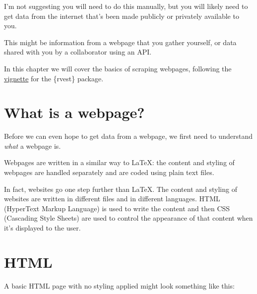 \documentclass[
  letterpaper,
  DIV=11,
  numbers=noendperiod]{scrreprt}
\begin{document}
I'm not suggesting you will need to do this manually, but you will
likely need to get data from the internet that's been made publicly or
privately available to you.

This might be information from a webpage that you gather yourself, or
data shared with you by a collaborator using an API.

In this chapter we will cover the basics of scraping webpages, following
the
\href{https://cran.r-project.org/web/packages/rvest/vignettes/rvest.html\#fnref3}{vignette}
for the \{rvest\} package.

\section{What is a webpage?}\label{what-is-a-webpage}

Before we can even hope to get data from a webpage, we first need to
understand \emph{what} a webpage is.

Webpages are written in a similar way to LaTeX: the content and styling
of webpages are handled separately and are coded using plain text files.

In fact, websites go one step further than LaTeX. The content and
styling of websites are written in different files and in different
languages. HTML (HyperText Markup Language) is used to write the content
and then CSS (Cascading Style Sheets) are used to control the appearance
of that content when it's displayed to the user.

\section{HTML}\label{html}

A basic HTML page with no styling applied might look something like
this:
\end{document}
